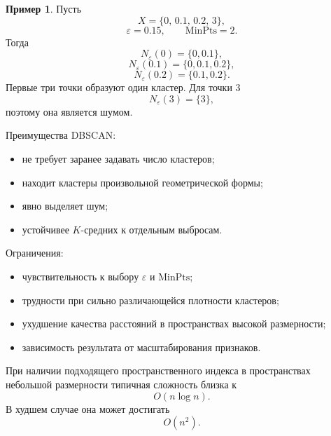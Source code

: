 \documentclass[12pt,a4paper]{article}
\theoremstyle{definition}
\newtheorem{example}[theorem]{Пример}
\theoremstyle{remark}
\begin{document}
\begin{example}
Пусть
\[
    X=\{0,\,0.1,\,0.2,\,3\},
\]
\[
    \varepsilon=0.15,
    \qquad
    \mathrm{MinPts}=2.
\]
Тогда
\[
    N_\varepsilon(0)=\{0,0.1\},
\]
\[
    N_\varepsilon(0.1)=\{0,0.1,0.2\},
\]
\[
    N_\varepsilon(0.2)=\{0.1,0.2\}.
\]
Первые три точки образуют один кластер. Для точки $3$
\[
    N_\varepsilon(3)=\{3\},
\]
поэтому она является шумом.

\begin{center}
\end{center}
\end{example}

Преимущества DBSCAN:

\begin{itemize}
    \item не требует заранее задавать число кластеров;
    \item находит кластеры произвольной геометрической формы;
    \item явно выделяет шум;
    \item устойчивее $K$-средних к отдельным выбросам.
\end{itemize}

Ограничения:

\begin{itemize}
    \item чувствительность к выбору $\varepsilon$ и $\mathrm{MinPts}$;
    \item трудности при сильно различающейся плотности кластеров;
    \item ухудшение качества расстояний в пространствах высокой размерности;
    \item зависимость результата от масштабирования признаков.
\end{itemize}

При наличии подходящего пространственного индекса в пространствах небольшой
размерности типичная сложность близка к
\[
    O(n\log n).
\]
В худшем случае она может достигать
\[
    O(n^2).
\]

\end{document}
